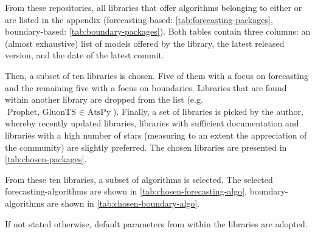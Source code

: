 From these repositories, all libraries that offer algorithms belonging to either
 or 
are listed in the appendix (forecasting-based: \cref{tab:forecasting-packages},
boundary-based: \cref{tab:boundary-packages}). Both tables contain three columns:
an (almost exhaustive) list of models offered by the library, the latest
released version, and the date of the latest commit.

Then, a subset of ten libraries is chosen. Five of them with a focus on forecasting
and the remaining five with a focus on boundaries. Libraries that are found within
another library are dropped from the list (e.g.\ \(\text{Prophet, GluonTS } \in \text{ AtsPy}\)).
Finally, a set of libraries is picked by the author, whereby recently updated libraries,
libraries with sufficient documentation and libraries with a high number of
stars (measuring to an extent the appreciation of the community) are slightly
preferred. The chosen libraries are presented in \cref{tab:chosen-packages}.

From these ten libraries, a subset of algorithms is selected. The selected
forecasting-algorithms are shown in \cref{tab:chosen-forecasting-algo},
boundary-algorithms are shown in \cref{tab:chosen-boundary-algo}.

If not stated otherwise, default parameters from within the libraries are adopted.
